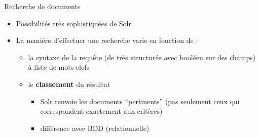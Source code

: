 
\begin{frame}{Recherche de documents}
  \begin{itemize}
      \setlength{\itemsep}{10pt}
    \item Possibilités très sophistiquées de Solr
    \item La manière d'effectuer une recherche varie en fonction de :
      \begin{itemize}
        \item la syntaxe de la requête (de très structurée avec booléen sur des
          champs) à liste de mots-clefs
        \item le {\bf classement} du résultat 
          \begin{itemize}
            \item Solr renvoie les documents ``pertinents'' (pas seulement ceux
              qui correspondent exactement aux critères)
            \item différence avec BDD (relationnelle)
          \end{itemize}
      \end{itemize}
  \end{itemize}
\end{frame} %

  

